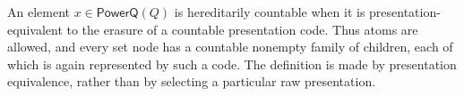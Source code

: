 \begin{definition}
An element $x\in\mathsf{PowerQ}(Q)$ is hereditarily countable when it is
presentation-equivalent to the erasure of a countable presentation code.
Thus atoms are allowed, and every set node has a countable nonempty family
of children, each of which is again represented by such a code.  The
definition is made by presentation equivalence, rather than by selecting a
particular raw presentation.
\end{definition}
